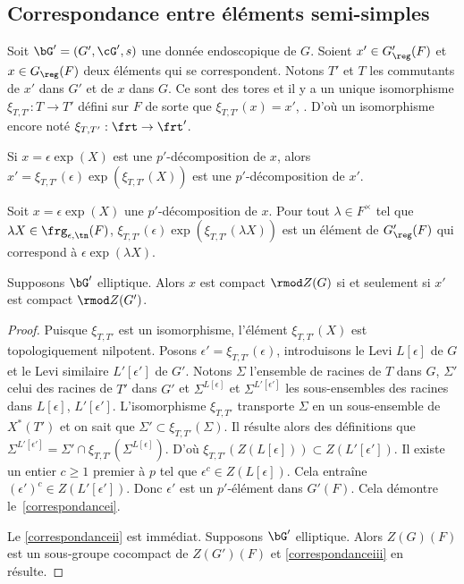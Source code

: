 \subsection{Correspondance entre éléments semi-simples}\label{correspondance}
Soit $\bG'=(G',\cG',s)$ une donnée endoscopique de $G$. Soient $x'\in G'_{\reg}(F)$ et $x\in G_{\reg}(F)$ deux éléments qui se correspondent. Notons $T'$ et $T$ les commutants de $x'$ dans $G'$ et de $x$ dans $G$. Ce sont des tores et il y a un unique isomorphisme $\xi_{T,T'}:T\to T'$ défini sur $F$ de sorte que $\xi_{T,T'}(x)=x'$, \cf \cite[I.1.10]{MW}. D'où un isomorphisme encore noté $\xi_{T,T'}:\frt\to \frt'$.

\skpt
\begin{cor*}
\begin{enumeratei}
\item\label{correspondancei}
Si $x=\epsilon \exp(X)$ est une $p'$-décomposition de $x$, alors $x'=\xi_{T,T'}(\epsilon)\exp(\xi_{T,T'}(X))$ est une $p'$-décomposition de $x'$.

\item\label{correspondanceii}
Soit $x=\epsilon \exp(X)$ une $p'$-décomposition de $x$. Pour tout $\lambda\in F^{\times}$ tel que $ \lambda X\in \frg_{\epsilon,\tn}(F)$, $\xi_{T,T'}(\epsilon)\exp(\xi_{T,T'}(\lambda X))$ est un élément de $G'_{\reg}(F)$ qui correspond à $\epsilon \exp(\lambda X)$.

\item\label{correspondanceiii}
Supposons $\bG'$ elliptique. Alors $x$ est compact $\rmod Z(G)$ si et seulement si $x'$ est compact $\rmod Z(G')$.
\end{enumeratei}
\end{cor*}

\begin{proof}
Puisque $\xi_{T,T'}$ est un isomorphisme, l'élément $\xi_{T,T'}(X)$ est topologiquement nilpotent. Posons $\epsilon'=\xi_{T,T'}(\epsilon)$, introduisons le Levi $L[\epsilon]$ de $G$ et le Levi similaire $L'[\epsilon']$ de $G'$. Notons $\Sigma$ l'ensemble de racines de $T$ dans $G$, $\Sigma'$ celui des racines de $T'$ dans $G'$ et $\Sigma^{L[\epsilon]}$ et $\Sigma^{L'[\epsilon']}$ les sous-ensembles des racines dans $L[\epsilon]$, \resp $L'[\epsilon']$. L'isomorphisme $\xi_{T,T'}$ transporte $\Sigma$ en un sous-ensemble de $X^*(T')$ et on sait que $\Sigma'\subset \xi_{T,T'}(\Sigma)$. Il résulte alors des définitions que $\Sigma^{L'[\epsilon']}=\Sigma'\cap \xi_{T,T'}(\Sigma^{L[\epsilon]})$. D'où $\xi_{T,T'}(Z(L[\epsilon]))\subset Z(L'[\epsilon'])$. Il existe un entier $c\geq1$ premier à $p$ tel que $\epsilon^c\in Z(L[\epsilon])$. Cela entraîne $(\epsilon')^c\in Z(L'[\epsilon'])$. Donc $\epsilon'$ est un $p'$-élément dans $G'(F)$. Cela démontre le~\eqref{correspondancei}.

Le \eqref{correspondanceii} est immédiat. Supposons $\bG'$ elliptique. Alors $Z(G)(F)$ est un sous-groupe cocompact de $Z(G')(F)$ et \eqref{correspondanceiii} en résulte.
\end{proof}

